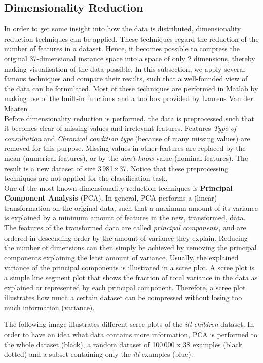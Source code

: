 \subsection{Dimensionality Reduction}\label{dimred}
In order to get some insight into how the data is distributed, dimensionality reduction techniques can be applied. These techniques regard the reduction of the number of features in a dataset. Hence, it becomes possible to compress the original 37-dimensional instance space into a space of only 2 dimensions, thereby making visualisation of the data possible. In this subsection, we apply several famous techniques and compare their results, such that a well-founded view of the data can be formulated. Most of these techniques are performed in Matlab by making use of the built-in functions and a toolbox provided by Laurens Van der Maaten~\cite{matlabToolbox}. \\
Before dimensionality reduction is performed, the data is preprocessed such that it becomes clear of missing values and irrelevant features.  Features \textit{Type of consultation} and \textit{Chronical condition type} (because of many missing values) are removed for this purpose. Missing values in other features are replaced by the mean (numerical features), or by the \textit{don't know} value (nominal features). The result is a new dataset of size 3\,981\,x\,37. Notice that these preprocessing techniques are not applied for the classification task.\\

\newpage
One of the most known dimensionality reduction techniques is \textbf{Principal Component Analysis} (PCA). In general, PCA performs a (linear) transformation on the original data, such that a maximum amount of its variance is explained by a minimum amount of features in the new, transformed, data. The features of the transformed data are called \textit{principal components}, and are ordered in descending order by the amount of variance they explain. Reducing the number of dimensions can then simply be achieved by removing the principal components explaining the least amount of variance. Usually, the explained variance of the principal components is illustrated in a scree plot. A scree plot is a simple line segment plot that shows the fraction of total variance in the data as explained or represented by each principal component. Therefore, a scree plot illustrates how much a certain dataset can be compressed without losing too much information (variance).

The following image illustrates different scree plots of the \textit{ill children} dataset. In order to have an idea what data contains more information, PCA is performed to the whole dataset (black), a random dataset of 100\,000 x 38 examples (black dotted) and a subset containing only the \textit{ill} examples (blue).\\

